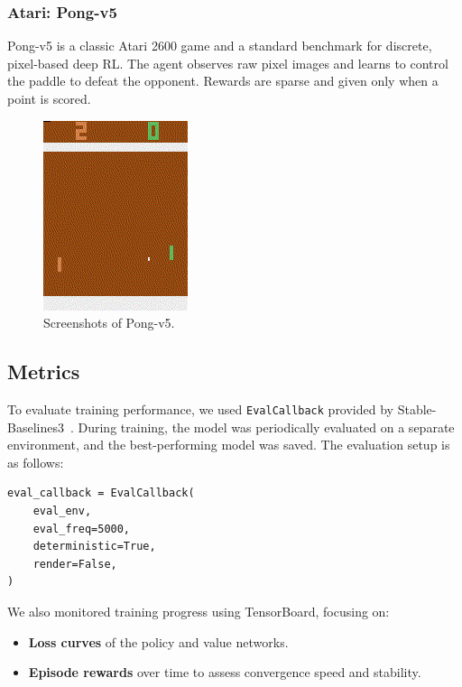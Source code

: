 \documentclass[10pt,twocolumn,letterpaper]{article}
\begin{document}
\subsubsection{Atari: Pong-v5}
Pong-v5 is a classic Atari 2600 game and a standard benchmark for discrete, pixel-based deep RL. The agent observes raw pixel images and learns to control the paddle to defeat the opponent. Rewards are sparse and given only when a point is scored.
\begin{figure}[h]
    \centering
    \includegraphics[width=0.4\linewidth]{assets/pong.png}
    \caption{Screenshots of Pong-v5.} 
    \label{fig:pong}
\end{figure}

\subsection{Metrics}
To evaluate training performance, we used \texttt{EvalCallback} provided by Stable-Baselines3~\cite{sb3}. During training, the model was periodically evaluated on a separate environment, and the best-performing model was saved. The evaluation setup is as follows:

\begin{lstlisting}
eval_callback = EvalCallback(
    eval_env,
    eval_freq=5000,
    deterministic=True,
    render=False,
)
\end{lstlisting}


We also monitored training progress using TensorBoard, focusing on:
\begin{itemize}
    \item \textbf{Loss curves} of the policy and value networks.
    \item \textbf{Episode rewards} over time to assess convergence speed and stability.
\end{itemize}
\end{document}

